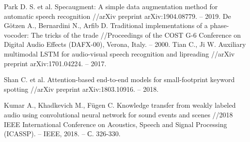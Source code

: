 \documentclass[a4paper,12pt]{article}
\begin{document}
 	\newpage
\begin{thebibliography}{9}
	Park D. S. et al. Specaugment: A simple data augmentation method for automatic speech recognition //arXiv preprint arXiv:1904.08779. – 2019.
	 De Götzen A., Bernardini N., Arfib D. Traditional implementations of a phase-vocoder: The tricks of the trade //Proceedings of the COST G-6 Conference on Digital Audio Effects (DAFX-00), Verona, Italy. – 2000.
	Tian C., Ji W. Auxiliary multimodal LSTM for audio-visual speech recognition and lipreading //arXiv preprint arXiv:1701.04224. – 2017.
	
	 Shan C. et al. Attention-based end-to-end models for small-footprint keyword spotting //arXiv preprint arXiv:1803.10916. – 2018.
	
	Kumar A., Khadkevich M., Fügen C. Knowledge transfer from weakly labeled audio using convolutional neural network for sound events and scenes //2018 IEEE International Conference on Acoustics, Speech and Signal Processing (ICASSP). – IEEE, 2018. – С. 326-330.
\end{thebibliography} 
 	
\end{document}
